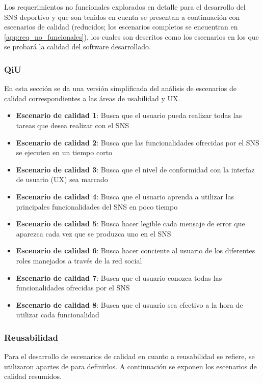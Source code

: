 Los requerimientos no funcionales explorados en detalle para el desarrollo del SNS deportivo y que son tenidos en cuenta se presentan a continuación con escenarios de calidad (reducidos; los escenarios completos se encuentran en \ref{app:req_no_funcionales}), los cuales son descritos como los escenarios en los que se probará la calidad del software desarrollado.

\subsubsection{QiU}

En esta sección se da una versión simplificada del análisis de escenarios de calidad correspondientes a las áreas de usabilidad y UX.

\begin{itemize}
	\item \textbf{Escenario de calidad 1}: Busca que el usuario pueda realizar todas las tareas que desea realizar con el SNS
	\item \textbf{Escenario de calidad 2}: Busca que las funcionalidades ofrecidas por el SNS se ejecuten en un tiempo corto
	\item \textbf{Escenario de calidad 3}: Busca que el nivel de conformidad con la interfaz de usuario (UX) sea marcado
	\item \textbf{Escenario de calidad 4}: Busca que el usuario aprenda a utilizar las principales funcionalidades del SNS en poco tiempo
	\item \textbf{Escenario de calidad 5}: Busca hacer legible cada mensaje de error que aparezca cada vez que se produzca uno en el SNS
	\item \textbf{Escenario de calidad 6}: Busca hacer conciente al usuario de los diferentes roles manejados a través de la red social
	\item \textbf{Escenario de calidad 7}: Busca que el usuario conozca todas las funcionalidades ofrecidas por el SNS
	\item \textbf{Escenario de calidad 8}: Busca que el usuario sea efectivo a la hora de utilizar cada funcionalidad
\end{itemize}

\subsubsection{Reusabilidad}

Para el desarrollo de escenarios de calidad en cuanto a reusabilidad se refiere, se utilizaron apartes de \cite{soa_principles} para definirlos. A continuación se exponen los escenarios de calidad resumidos.

